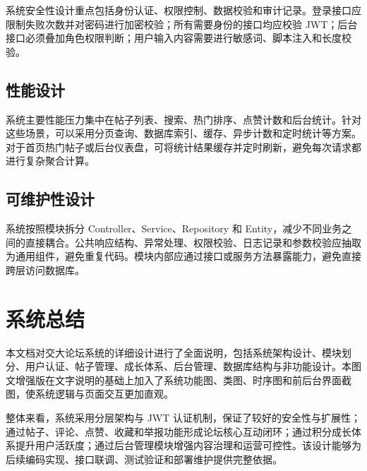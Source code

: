 \documentclass[bwprint]{report}
\begin{document}
系统安全性设计重点包括身份认证、权限控制、数据校验和审计记录。登录接口应限制失败次数并对密码进行加密校验；所有需要身份的接口均应校验 JWT；后台接口必须叠加角色权限判断；用户输入内容需要进行敏感词、脚本注入和长度校验。

\subsection{性能设计}

系统主要性能压力集中在帖子列表、搜索、热门排序、点赞计数和后台统计。针对这些场景，可以采用分页查询、数据库索引、缓存、异步计数和定时统计等方案。对于首页热门帖子或后台仪表盘，可将统计结果缓存并定时刷新，避免每次请求都进行复杂聚合计算。

\subsection{可维护性设计}

系统按照模块拆分 Controller、Service、Repository 和 Entity，减少不同业务之间的直接耦合。公共响应结构、异常处理、权限校验、日志记录和参数校验应抽取为通用组件，避免重复代码。模块内部应通过接口或服务方法暴露能力，避免直接跨层访问数据库。

\section{系统总结}

本文档对交大论坛系统的详细设计进行了全面说明，包括系统架构设计、模块划分、用户认证、帖子管理、成长体系、后台管理、数据库结构与非功能设计。本图文增强版在文字说明的基础上加入了系统功能图、类图、时序图和前后台界面截图，使系统逻辑与页面交互更加直观。

整体来看，系统采用分层架构与 JWT 认证机制，保证了较好的安全性与扩展性；通过帖子、评论、点赞、收藏和举报功能形成论坛核心互动闭环；通过积分成长体系提升用户活跃度；通过后台管理模块增强内容治理和运营可控性。该设计能够为后续编码实现、接口联调、测试验证和部署维护提供完整依据。
\end{document}
